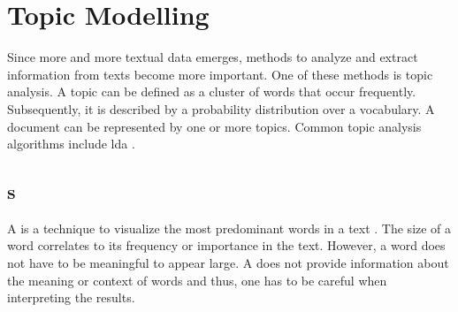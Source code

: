 \section{Topic Modelling}\label{sec:topic-modeling}

Since more and more textual data emerges, methods to analyze and extract information from texts become more important.
One of these methods is topic analysis.
A topic can be defined as a cluster of words that occur frequently.
Subsequently, it is described by a probability distribution over a vocabulary.
A document can be represented by one or more topics. %
Common topic analysis algorithms include \ac{lda} \cite{topic_modeling2015}.







\subsection{\wordcloud{}s}\label{subsec:word-clouds}

A \wordcloud{} is a technique to visualize the most predominant words in a text \cite{topic_modeling2019}.
The size of a word correlates to its frequency or importance in the text.
However, a word does not have to be meaningful to appear large.
A \wordcloud{} does not provide information about the meaning or context of words and thus, 
one has to be careful when interpreting the results.